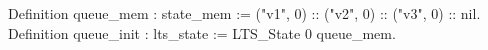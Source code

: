 Definition queue_mem : state_mem := 
  ("v1", 0) :: ("v2", 0) :: ("v3", 0) :: nil.
Definition queue_init : lts_state := LTS_State 0 queue_mem.